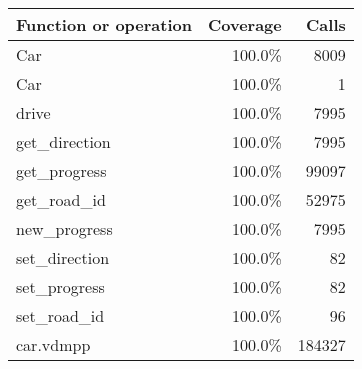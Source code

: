 \documentclass[a4paper]{article}
\begin{document}
\bigskip
\begin{longtable}{|l|r|r|}
\hline
Function or operation & Coverage & Calls \\
\hline
\hline
Car & 100.0\% & 8009 \\
\hline
Car & 100.0\% & 1 \\
\hline
drive & 100.0\% & 7995 \\
\hline
get\_direction & 100.0\% & 7995 \\
\hline
get\_progress & 100.0\% & 99097 \\
\hline
get\_road\_id & 100.0\% & 52975 \\
\hline
new\_progress & 100.0\% & 7995 \\
\hline
set\_direction & 100.0\% & 82 \\
\hline
set\_progress & 100.0\% & 82 \\
\hline
set\_road\_id & 100.0\% & 96 \\
\hline
\hline
car.vdmpp & 100.0\% & 184327 \\
\hline
\end{longtable}
\end{document}
